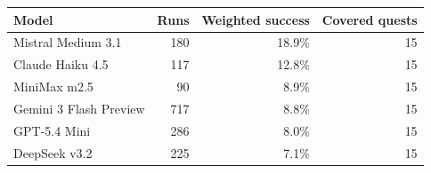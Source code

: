 \begin{tabular}{lrrr}
\toprule
Model & Runs & Weighted success & Covered quests \\
\midrule
Mistral Medium 3.1 & 180 & 18.9\% & 15 \\
Claude Haiku 4.5 & 117 & 12.8\% & 15 \\
MiniMax m2.5 & 90 & 8.9\% & 15 \\
Gemini 3 Flash Preview & 717 & 8.8\% & 15 \\
GPT-5.4 Mini & 286 & 8.0\% & 15 \\
DeepSeek v3.2 & 225 & 7.1\% & 15 \\
\bottomrule
\end{tabular}
